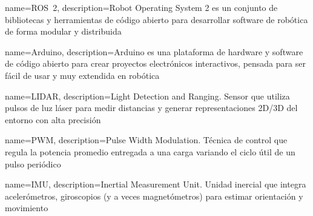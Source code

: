 {
    name=ROS~2,
    description={Robot Operating System 2 es un conjunto de bibliotecas y herramientas de código abierto para desarrollar software de robótica de forma modular y distribuida}
}

{
    name=Arduino,
    description={Arduino es una plataforma de hardware y software de código abierto para crear proyectos electrónicos interactivos, pensada para ser fácil de usar y muy extendida en robótica}
}

{
    name=LIDAR,
    description={Light Detection and Ranging. Sensor que utiliza pulsos de luz láser para medir distancias y generar representaciones 2D/3D del entorno con alta precisión}
}


{
    name=PWM,
    description={Pulse Width Modulation. Técnica de control que regula la potencia promedio entregada a una carga variando el ciclo útil de un pulso periódico}
}

{
    name=IMU,
    description={Inertial Measurement Unit. Unidad inercial que integra acelerómetros, giroscopios (y a veces magnetómetros) para estimar orientación y movimiento}
}
